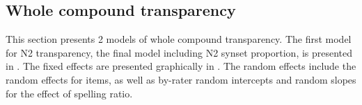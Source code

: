 \subsection{Whole compound transparency}
\label{sec:bellschaefer2016wholecompound}

This section presents 2 models of whole compound transparency. The
first model for N2 transparency, the final model including N2 synset proportion, is presented in
. The fixed effects are
presented graphically in
. The random effects include
the random effects for items, as well as by-rater random
intercepts and random slopes for the effect of spelling ratio.
\begin{table}





\end{table}
